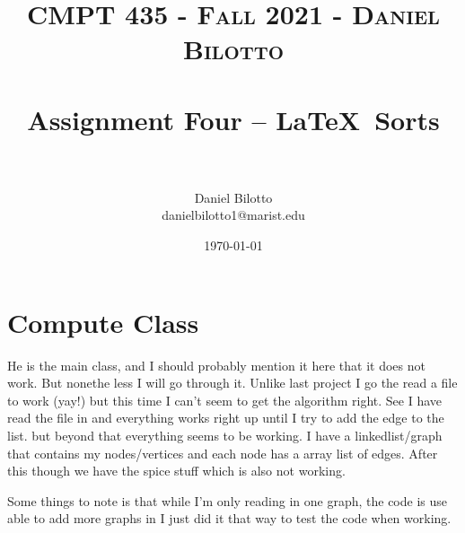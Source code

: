 \documentclass[letterpaper, 10pt]{article}
\title{	
   \normalfont \normalsize 
   \textsc{CMPT 435 - Fall 2021 - Daniel Bilotto} \\[10pt] %
   \horrule{0.5pt} \\[0.25cm] 	%
   \huge Assignment Four -- \LaTeX ~Sorts \\     	    %
   \horrule{0.5pt} \\[0.25cm] 	%
}
\author{Daniel Bilotto \\ \normalsize danielbilotto1@marist.edu}
\date{\normalsize\today} 	%
\begin{document}
\maketitle %



\section{Compute Class}
He is the main class, and I should probably mention it here that it does not work. But nonethe less I will go through it. Unlike last project I go the read a file to work (yay!) but this time I can't seem to get the algorithm right. See I have read the file in and everything works right up until I try to add the edge to the list. but beyond that everything seems to be working. I have a linkedlist/graph that contains my nodes/vertices and each node has a array list of edges. After this though we have the spice stuff which is also not working. 

Some things to note is that while I'm only reading in one graph, the code is use able to add more graphs in I just did it that way to test the code when working.
\end{document}

